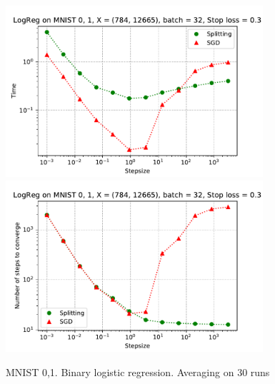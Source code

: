 \documentclass{article}
\begin{document}
\begin{figure}
\includegraphics[width=0.85\textwidth]{sgd_split_iterations_logreg.pdf} \\
\includegraphics[width=0.85\textwidth]{sgd_split_time_logreg.pdf}

\caption{MNIST 0,1. Binary logistic regression. Averaging on 30 runs}
\end{figure}
\end{document}
